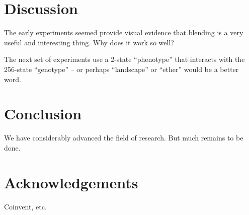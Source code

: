 \documentclass{AISB2008}
\begin{document}
\section{Discussion}

The early experiments seemed provide visual evidence that blending is
a very useful and interesting thing.  Why does it work so well? 

The next set of experiments use a 2-state ``phenotype'' that interacts
with the 256-state ``genotype'' -- or perhaps ``landscape'' or
``ether'' would be a better word.

\clearpage

\section{Conclusion}
\nocite{*}
We have considerably advanced the field of research.
But much remains to be done.


\section{Acknowledgements}

Coinvent, etc.


\end{document}
